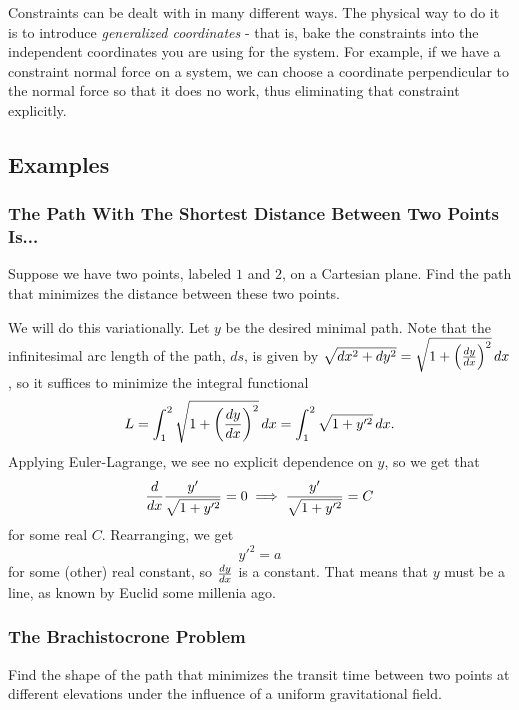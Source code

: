Constraints can be dealt with in many different ways. The physical way to do it is to introduce \textit{generalized coordinates} - that is, bake the constraints into the independent coordinates you are using for the system. For example, if we have a constraint normal force on a system, we can choose a coordinate perpendicular to the normal force so that it does no work, thus eliminating that constraint explicitly. 

\subsection{Examples} 
\subsubsection{The Path With The Shortest Distance Between Two Points Is...}
\begin{problem}
Suppose we have two points, labeled $1$ and $2$, on a Cartesian plane. Find the path that minimizes the distance between these two points. 
\end{problem}

\begin{solution}
We will do this variationally. Let $y$ be the desired minimal path. Note that the infinitesimal arc length of the path, $ds$, is given by $\sqrt{dx^2 + dy^2} = \sqrt{1 + \left(\frac{d y}{d x}\right)^2} \, dx$, so it suffices to minimize the integral functional
\[
	L = \int_1^2 \sqrt{1 + \left(\frac{d y}{d x}\right)^2} \, dx = \int_1^2 \sqrt{1 + y'^2} \, dx.
\]
Applying Euler-Lagrange, we see no explicit dependence on $y$, so we get that 
\[
	\frac{d }{d x} \frac{y'}{\sqrt{1+y'^2}} = 0 \implies
	\frac{y'}{\sqrt{1+y'^2}}  = C
\]
for some real $C$. Rearranging, we get 
\[
	y'^2 = a
\]
for some (other) real constant, so $\frac{d y}{d x}$ is a constant. That means that $y$ must be a line, as known by Euclid some millenia ago. 
\end{solution}

\subsubsection{The Brachistocrone Problem}
\begin{problem}
Find the shape of the path that minimizes the transit time between two points at different elevations under the influence of a uniform gravitational field.
\end{problem}

